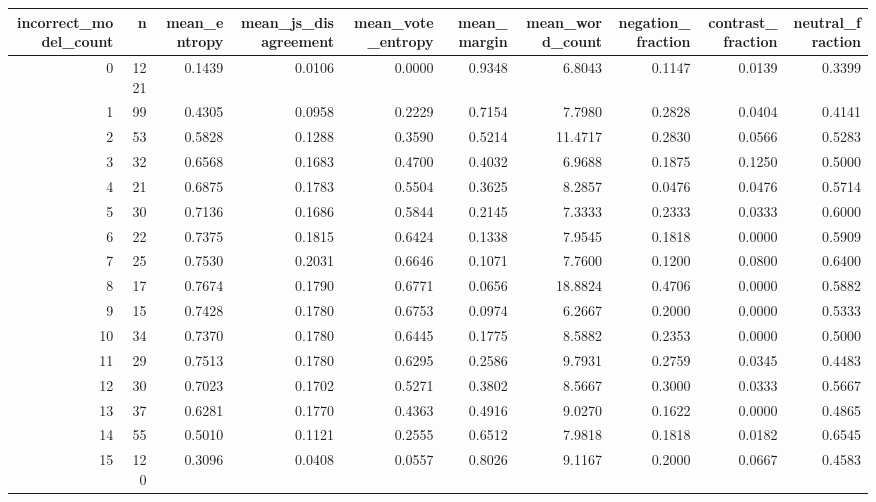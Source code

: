 \begin{tabular}{rrrrrrrrrr}
\toprule
incorrect\_model\_count & n & mean\_entropy & mean\_js\_disagreement & mean\_vote\_entropy & mean\_margin & mean\_word\_count & negation\_fraction & contrast\_fraction & neutral\_fraction \\
\midrule
0 & 1221 & 0.1439 & 0.0106 & 0.0000 & 0.9348 & 6.8043 & 0.1147 & 0.0139 & 0.3399 \\
1 & 99 & 0.4305 & 0.0958 & 0.2229 & 0.7154 & 7.7980 & 0.2828 & 0.0404 & 0.4141 \\
2 & 53 & 0.5828 & 0.1288 & 0.3590 & 0.5214 & 11.4717 & 0.2830 & 0.0566 & 0.5283 \\
3 & 32 & 0.6568 & 0.1683 & 0.4700 & 0.4032 & 6.9688 & 0.1875 & 0.1250 & 0.5000 \\
4 & 21 & 0.6875 & 0.1783 & 0.5504 & 0.3625 & 8.2857 & 0.0476 & 0.0476 & 0.5714 \\
5 & 30 & 0.7136 & 0.1686 & 0.5844 & 0.2145 & 7.3333 & 0.2333 & 0.0333 & 0.6000 \\
6 & 22 & 0.7375 & 0.1815 & 0.6424 & 0.1338 & 7.9545 & 0.1818 & 0.0000 & 0.5909 \\
7 & 25 & 0.7530 & 0.2031 & 0.6646 & 0.1071 & 7.7600 & 0.1200 & 0.0800 & 0.6400 \\
8 & 17 & 0.7674 & 0.1790 & 0.6771 & 0.0656 & 18.8824 & 0.4706 & 0.0000 & 0.5882 \\
9 & 15 & 0.7428 & 0.1780 & 0.6753 & 0.0974 & 6.2667 & 0.2000 & 0.0000 & 0.5333 \\
10 & 34 & 0.7370 & 0.1780 & 0.6445 & 0.1775 & 8.5882 & 0.2353 & 0.0000 & 0.5000 \\
11 & 29 & 0.7513 & 0.1780 & 0.6295 & 0.2586 & 9.7931 & 0.2759 & 0.0345 & 0.4483 \\
12 & 30 & 0.7023 & 0.1702 & 0.5271 & 0.3802 & 8.5667 & 0.3000 & 0.0333 & 0.5667 \\
13 & 37 & 0.6281 & 0.1770 & 0.4363 & 0.4916 & 9.0270 & 0.1622 & 0.0000 & 0.4865 \\
14 & 55 & 0.5010 & 0.1121 & 0.2555 & 0.6512 & 7.9818 & 0.1818 & 0.0182 & 0.6545 \\
15 & 120 & 0.3096 & 0.0408 & 0.0557 & 0.8026 & 9.1167 & 0.2000 & 0.0667 & 0.4583 \\
\bottomrule
\end{tabular}
